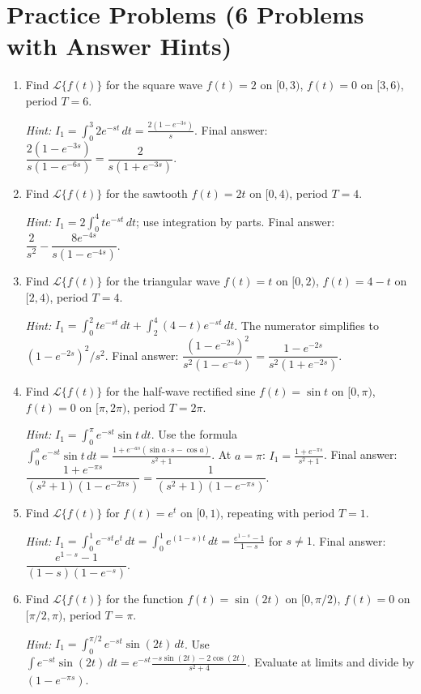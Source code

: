 \documentclass[12pt,a4paper]{article}
\begin{document}
\section{Practice Problems (6 Problems with Answer Hints)}

\begin{enumerate}[label=\textbf{P\arabic*.}, leftmargin=*]

\item Find $\mathcal{L}\{f(t)\}$ for the square wave $f(t) = 2$ on
$[0, 3)$, $f(t) = 0$ on $[3, 6)$, period $T = 6$.

\textit{Hint:} $I_1 = \int_0^3 2e^{-st}\,dt = \frac{2(1-e^{-3s})}{s}$.
Final answer: $\dfrac{2(1-e^{-3s})}{s(1-e^{-6s})} = \dfrac{2}{s(1+e^{-3s})}$.

\item Find $\mathcal{L}\{f(t)\}$ for the sawtooth $f(t) = 2t$ on
$[0, 4)$, period $T = 4$.

\textit{Hint:} $I_1 = 2\int_0^4 te^{-st}\,dt$; use integration by parts.
Final answer: $\dfrac{2}{s^2} - \dfrac{8e^{-4s}}{s(1-e^{-4s})}$.

\item Find $\mathcal{L}\{f(t)\}$ for the triangular wave $f(t) = t$
on $[0,2)$, $f(t) = 4-t$ on $[2,4)$, period $T=4$.

\textit{Hint:} $I_1 = \int_0^2 te^{-st}\,dt + \int_2^4(4-t)e^{-st}\,dt$.
The numerator simplifies to $(1-e^{-2s})^2/s^2$.
Final answer: $\dfrac{(1-e^{-2s})^2}{s^2(1-e^{-4s})} = \dfrac{1-e^{-2s}}{s^2(1+e^{-2s})}$.

\item Find $\mathcal{L}\{f(t)\}$ for the half-wave rectified sine
$f(t) = \sin t$ on $[0, \pi)$, $f(t) = 0$ on $[\pi, 2\pi)$,
period $T = 2\pi$.

\textit{Hint:} $I_1 = \int_0^\pi e^{-st}\sin t\,dt$.
Use the formula $\int_0^a e^{-st}\sin t\,dt =
\frac{1+e^{-as}(\sin a \cdot s - \cos a)}{s^2+1}$.
At $a=\pi$: $I_1 = \frac{1 + e^{-\pi s}}{s^2+1}$.
Final answer: $\dfrac{1+e^{-\pi s}}{(s^2+1)(1-e^{-2\pi s})}
= \dfrac{1}{(s^2+1)(1-e^{-\pi s})}$.

\item Find $\mathcal{L}\{f(t)\}$ for $f(t) = e^t$ on $[0, 1)$,
repeating with period $T = 1$.

\textit{Hint:} $I_1 = \int_0^1 e^{-st} e^{t}\,dt = \int_0^1 e^{(1-s)t}\,dt
= \frac{e^{1-s}-1}{1-s}$ for $s \ne 1$.
Final answer: $\dfrac{e^{1-s}-1}{(1-s)(1-e^{-s})}$.

\item Find $\mathcal{L}\{f(t)\}$ for the function
$f(t) = \sin(2t)$ on $[0, \pi/2)$, $f(t) = 0$ on $[\pi/2, \pi)$,
period $T = \pi$.

\textit{Hint:} $I_1 = \int_0^{\pi/2} e^{-st}\sin(2t)\,dt$.
Use $\int e^{-st}\sin(2t)\,dt = e^{-st}\frac{-s\sin(2t)-2\cos(2t)}{s^2+4}$.
Evaluate at limits and divide by $(1-e^{-\pi s})$.

\end{enumerate}
\end{document}
